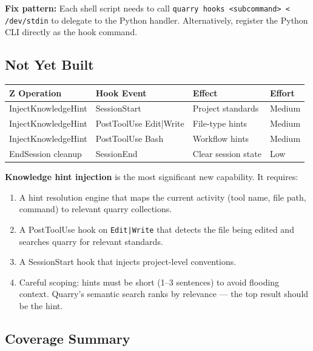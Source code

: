 \documentclass[a4paper,10pt,fleqn]{article}
\begin{document}
\textbf{Fix pattern:} Each shell script needs to call
\texttt{quarry hooks <subcommand> < /dev/stdin} to delegate to the
Python handler. Alternatively, register the Python CLI directly as
the hook command.

\subsection{Not Yet Built}

\begin{tabular}{llll}
\hline
\textbf{Z Operation} & \textbf{Hook Event} & \textbf{Effect} & \textbf{Effort} \\
\hline
InjectKnowledgeHint & SessionStart & Project standards & Medium \\
InjectKnowledgeHint & PostToolUse Edit|Write & File-type hints & Medium \\
InjectKnowledgeHint & PostToolUse Bash & Workflow hints & Medium \\
EndSession cleanup & SessionEnd & Clear session state & Low \\
\hline
\end{tabular}

\textbf{Knowledge hint injection} is the most significant new
capability. It requires:

\begin{enumerate}
  \item A hint resolution engine that maps the current activity
    (tool name, file path, command) to relevant quarry collections.
  \item A PostToolUse hook on \texttt{Edit|Write} that detects the
    file being edited and searches quarry for relevant standards.
  \item A SessionStart hook that injects project-level conventions.
  \item Careful scoping: hints must be short (1--3 sentences) to
    avoid flooding context. Quarry's semantic search ranks by
    relevance --- the top result should be the hint.
\end{enumerate}

\subsection{Coverage Summary}
\end{document}
